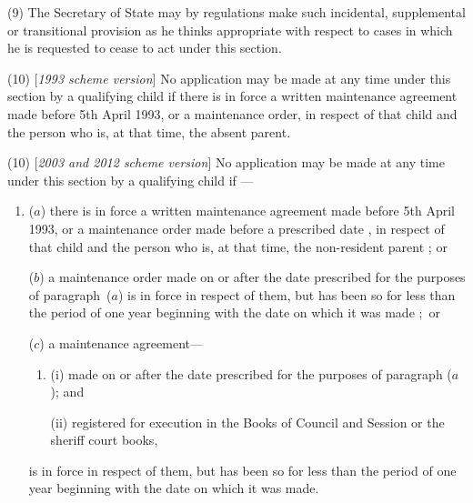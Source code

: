 \documentclass[12pt,a4paper]{article}
\begin{document}
(9) The Secretary of State may by regulations make such incidental, supplemental or transitional provision as he thinks appropriate with respect to cases in which he is requested to cease to act under this section.

(10) [\emph{1993 scheme version}] No application may be made at any time under this section by a qualifying child if there is in force a written maintenance agreement made before 5th April 1993, or a maintenance order, in respect of that child and the person who is, at that time, the absent parent.

(10) [\emph{2003 and 2012 scheme version}] No application may be made at any time under this section by a qualifying child if%
---
\begin{enumerate}\item[]
($a$) %
 there is in force a written maintenance agreement made before 5th April 1993, or a maintenance order
made before a prescribed date%
, in respect of that child and the person who is, at that time, the 
non-resident parent%
; or

($b$) a maintenance order made on or after the date prescribed for the purposes of paragraph~($a$)  is in force in respect of them, but has been so for less than the period of one year beginning with the date on which it was made%
;~or 

($c$) a maintenance agreement—
\begin{enumerate}\item[]
(i) made on or after the date prescribed for the purposes of paragraph ($a$); and

(ii) registered for execution in the Books of Council and Session or the sheriff court books,
\end{enumerate}
is in force in respect of them, but has been so for less than the period of one year beginning with the date on which it was made.
\end{enumerate}
\end{document}
